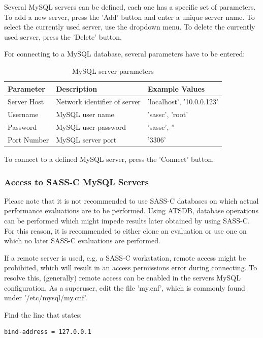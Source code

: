 Several MySQL servers can be defined, each one has a specific set of parameters. To add a new server, press the 'Add' button and enter a unique server name. To select the currently used server, use the dropdown menu. To delete the currently used server, press the 'Delete' button.

For connecting to a MySQL database, several parameters have to be entered:

\begin{table}[H]
  \center
  \begin{tabular}{ | l | l | l |}
    \hline
    \textbf{Parameter} & \textbf{Description} & \textbf{Example Values} \\ \hline
    Server Host & Network identifier of server & 'localhost', '10.0.0.123' \\ \hline
    Username & MySQL user name & 'sassc', 'root' \\ \hline
    Password & MySQL user password & 'sassc', '' \\ \hline
    Port Number & MySQL server port & '3306' \\
    \hline
  \end{tabular}
  \caption{MySQL server parameters}
\end{table}

To connect to a defined MySQL server, press the 'Connect' button.\\

\subsubsection{Access to SASS-C MySQL Servers}

Please note that it is not recommended to use SASS-C databases on which actual performance evaluations are to be performed. Using ATSDB, database operations can be performed which might impede results later obtained by using SASS-C. For this reason, it is recommended to either clone an evaluation or use one on which no later SASS-C evaluations are performed.

If a remote server is used, e.g. a SASS-C workstation, remote access might be prohibited, which will result in an access permissions error during connecting. To resolve this, (generally) remote access can be enabled in the servers MySQL configuration. As a superuser, edit the file 'my.cnf', which is commonly found under '/etc/mysql/my.cnf'. 

Find the line that states:
\begin{verbatim}
bind-address = 127.0.0.1
\end{verbatim}

